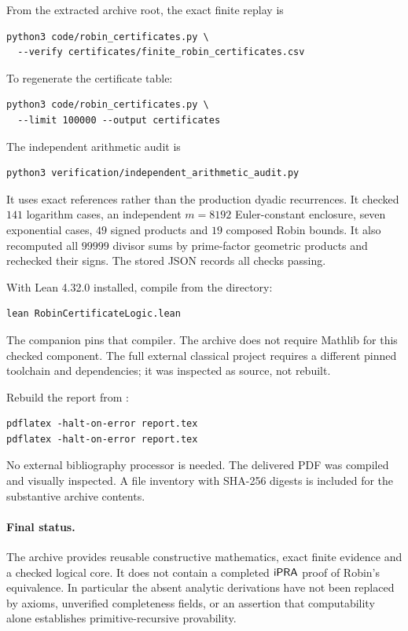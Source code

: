 From the extracted archive root, the exact finite replay is
\begin{lstlisting}
python3 code/robin_certificates.py \
  --verify certificates/finite_robin_certificates.csv
\end{lstlisting}
To regenerate the certificate table:
\begin{lstlisting}
python3 code/robin_certificates.py \
  --limit 100000 --output certificates
\end{lstlisting}
The independent arithmetic audit is
\begin{lstlisting}
python3 verification/independent_arithmetic_audit.py
\end{lstlisting}
It uses exact \code{Fraction} references rather than the production
dyadic recurrences. It checked $141$ logarithm cases, an independent
$m=8192$ Euler-constant enclosure, seven exponential cases, $49$
signed products and $19$ composed Robin bounds. It also recomputed
all $99999$ divisor sums by prime-factor geometric products and
rechecked their signs. The stored JSON records all checks passing.

With Lean 4.32.0 installed, compile from the \code{lean/} directory:
\begin{lstlisting}
lean RobinCertificateLogic.lean
\end{lstlisting}
The companion  pins that compiler. The archive
does not require Mathlib for this checked component.
The full external classical project requires a different pinned
toolchain and dependencies; it was inspected as source, not rebuilt.

Rebuild the report from \code{paper/}:
\begin{lstlisting}
pdflatex -halt-on-error report.tex
pdflatex -halt-on-error report.tex
\end{lstlisting}
No external bibliography processor is needed. The delivered PDF
was compiled and visually inspected. A file inventory with
SHA-256 digests is included for the substantive archive contents.

\paragraph{Final status.}
The archive provides reusable constructive mathematics, exact
finite evidence and a checked logical core. It does not contain
a completed $\mathsf{iPRA}$ proof of Robin's equivalence. In particular
the absent analytic derivations have not been replaced by axioms,
unverified completeness fields, or an assertion that computability
alone establishes primitive-recursive provability.
